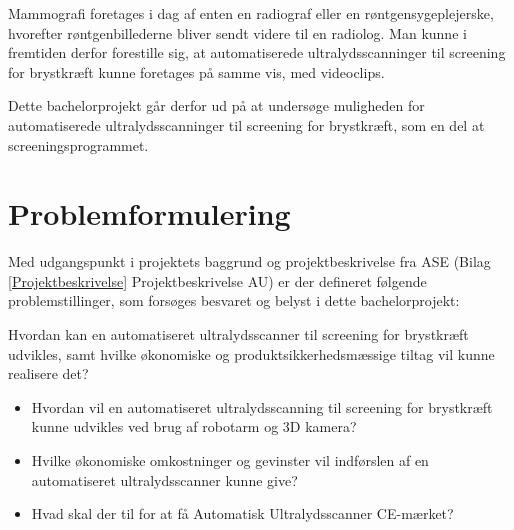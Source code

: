 Mammografi foretages i dag af enten en radiograf eller en røntgensygeplejerske, hvorefter røntgenbillederne bliver sendt videre til en radiolog. Man kunne i fremtiden derfor forestille sig, at automatiserede ultralydsscanninger til screening for brystkræft kunne foretages på samme vis, med videoclips.

Dette bachelorprojekt går derfor ud på at undersøge muligheden for automatiserede ultralydsscanninger til screening for brystkræft, som en del at screeningsprogrammet.

\section{Problemformulering}
Med udgangspunkt i projektets baggrund og projektbeskrivelse fra ASE (Bilag \ref{Projektbeskrivelse} Projektbeskrivelse AU) er der defineret følgende problemstillinger, som forsøges besvaret og belyst i dette bachelorprojekt:

Hvordan kan en automatiseret ultralydsscanner til screening for brystkræft udvikles, samt hvilke økonomiske og produktsikkerhedsmæssige tiltag vil kunne realisere det?

\let\labelitemi\labelitemii
\begin{itemize}
\item Hvordan vil en automatiseret ultralydsscanning til screening for brystkræft kunne udvikles ved brug af robotarm og 3D kamera?
\item Hvilke økonomiske omkostninger og gevinster vil indførslen af en automatiseret ultralydsscanner kunne give? 
\item Hvad skal der til for at få Automatisk Ultralydsscanner CE-mærket? 
\end{itemize}